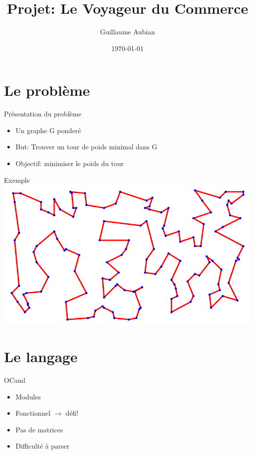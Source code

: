 \documentclass{beamer}
\title{Projet: Le Voyageur du Commerce}
\author{Guillaume Aubian}
\date{\today}
\begin{document}

\frame{\titlepage}

\section{Le problème}

\begin{frame}{Présentation du problème}
\begin{itemize}
\item Un graphe G ponderé
\item But: Trouver un tour de poids minimal dans G
\item Objectif: minimiser le poids du tour
\end{itemize}
\end{frame}

\begin{frame}{Exemple}
\includegraphics[scale=0.5]{tsp_ex1_2opt.png}
\end{frame}

\section{Le langage}
\begin{frame}{OCaml}
\begin{itemize}
\color{green}
\item Modules
\item Fonctionnel $\rightarrow$ défi!
\color{red}
\item Pas de matrices
\item Difficulté à parser
\end{itemize}
\end{frame}
\end{document}

